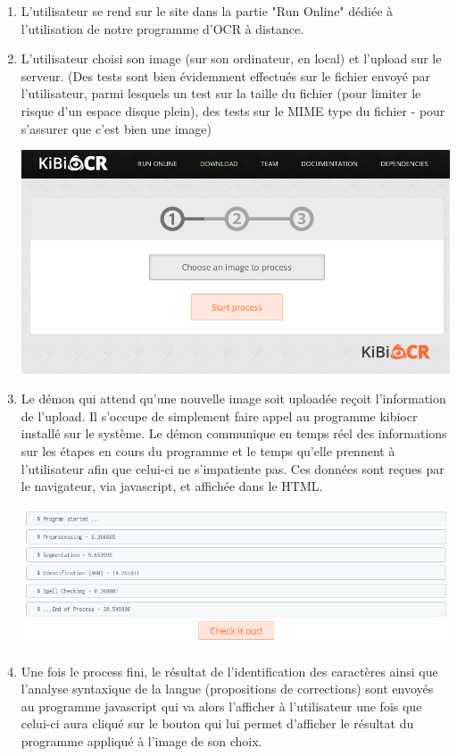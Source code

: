 \begin{enumerate}
  \item L'utilisateur se rend sur le site dans la partie "Run Online" dédiée à
    l'utilisation de notre programme d'OCR à distance.
  \item L'utilisateur choisi son image (sur son ordinateur, en local) et
    l'upload sur le serveur. (Des tests sont bien évidemment effectués sur le
    fichier envoyé par l'utilisateur, parmi lesquels un test sur la taille du
    fichier (pour limiter le risque d'un espace disque plein), des tests sur le
    MIME type du fichier - pour s'assurer que c'est bien une image)

    \begin{center}
      \includegraphics[scale=0.35]{chapters/Pictures/toogy/guy.png}
    \end{center}

  \item Le démon qui attend qu'une nouvelle image soit uploadée reçoit
    l'information de l'upload. Il s'occupe de simplement faire appel au
    programme kibiocr installé sur le système. Le démon communique en temps réel
    des informations sur les étapes en cours du programme et le temps qu'elle
    prennent à l'utilisateur afin que celui-ci ne s'impatiente pas. Ces données
    sont reçues par le navigateur, via javascript, et affichée dans le HTML.
    
    \begin{center}
      \includegraphics[scale=0.42]{chapters/Pictures/toogy/guy-process.png}
    \end{center}
  \item Une fois le process fini, le résultat de l'identification des caractères
    ainsi que l'analyse syntaxique de la langue (propositions de corrections)
    sont envoyés au programme javascript qui va alors l'afficher à l'utilisateur
    une fois que celui-ci aura cliqué sur le bouton qui lui permet d'afficher le
    résultat du programme appliqué à l'image de son choix.
    

\end{enumerate}
